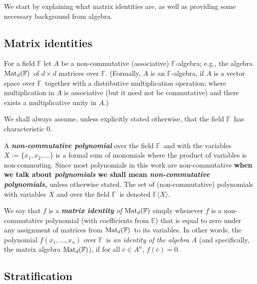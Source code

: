 \documentclass[12pt,reqno]{article}
\newcommand\F{\ensuremath{\mathbb F}}
\newcommand{\matd}{{\ensuremath{{\rm Mat}_d(\F)}}}
\newcommand{\freea}{\ensuremath{\F\langle X\rangle}}
\newcommand{\dbyd}{\ensuremath{d\times d}}
\begin{document}
We start by explaining what  matrix identities are, as well as providing some necessary  background from algebra.

\subsection{Matrix identities}\label{sec:ovrv:mat_identities}

For a field $\F$ let $A$ be a non-commutative (associative) \F-algebra; e.g., the algebra \matd\ of $d\times d$ matrices over  $\F$.
(Formally, $A$ is an $\F$-algebra, if $A$ is a vector space over \F\ together with a distributive multiplication operation; where multiplication in $A$ is associative (but it need not be commutative) and there exists a multiplicative unity in $A$.)

We shall always assume, unless explicitly stated otherwise, that the field \F\ has characteristic 0.

A \textit{\textbf{non-commutative polynomial}} over the field \F\ and with the variables $X:=\{x_1,x_2,\ldots\}$ is a formal sum of monomials where the product of variables is non-commuting.  Since most polynomials in this work are non-commutative \textbf{when we talk about \textit{polynomials }we shall mean \textit{non-commutative polynomials, }}unless otherwise stated.
The set of (non-commutative) polynomials with variables $X$ and over the field \F\ is denoted \freea.

We say that $f$ is a \textit{\textbf{matrix identity} of \matd} simply whenever $f$ is a  non-commutative polynomial (with coefficients from \F) that is equal to zero under any assignment of matrices from \matd\ to its variables. In other words, the  polynomial \(f(x_1,\ldots,x_n)\) over \F\ is \textit{an identity of  the algebra $A$} (and specifically, the matrix algebra \matd), if for all $\overline c\in A^n$, $f(\overline c)=0$.


%


\subsection{Stratification}\label{sec:ovrv:stratification}
\end{document}
